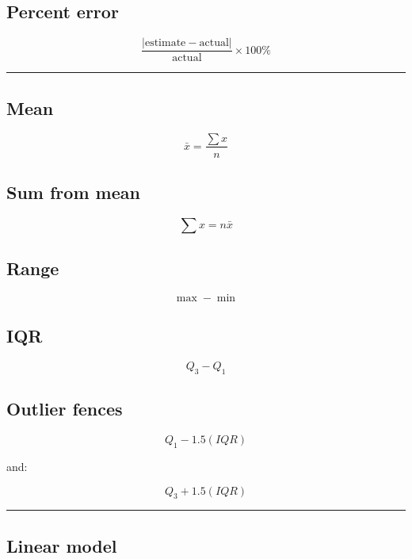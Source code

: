 \documentclass[
]{article}
\begin{document}
\subsection{Percent error}\label{percent-error-1}

\[
\boxed{
\frac{|\text{estimate}-\text{actual}|}
{\text{actual}}\times100\%
}
\]

\begin{center}\rule{0.5\linewidth}{0.5pt}\end{center}

\subsection{Mean}\label{mean-1}

\[
\boxed{\bar x=\frac{\sum x}{n}}
\]

\subsection{Sum from mean}\label{sum-from-mean}

\[
\boxed{\sum x=n\bar x}
\]

\subsection{Range}\label{range-1}

\[
\boxed{\max-\min}
\]

\subsection{IQR}\label{iqr}

\[
\boxed{Q_3-Q_1}
\]

\subsection{Outlier fences}\label{outlier-fences}

\[
\boxed{Q_1-1.5(IQR)}
\]

and:

\[
\boxed{Q_3+1.5(IQR)}
\]

\begin{center}\rule{0.5\linewidth}{0.5pt}\end{center}

\subsection{Linear model}\label{linear-model}
\end{document}
